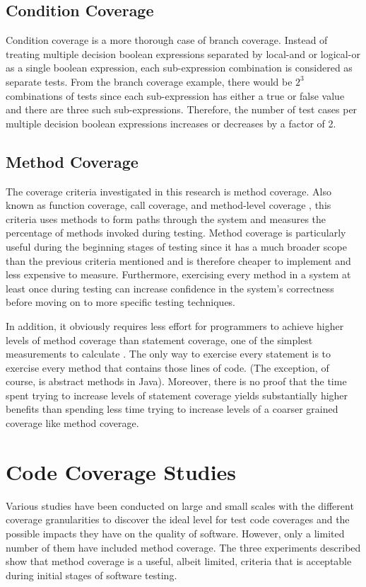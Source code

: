 \subsection{Condition Coverage}
Condition coverage is a more thorough case of branch coverage.  Instead of
treating multiple decision boolean expressions separated by local-and or
logical-or as a single boolean expression, each sub-expression combination
is considered as separate tests.  From the branch coverage example, there
would be $2^3$ combinations of tests since each sub-expression has either a
true or false value and there are three such sub-expressions.  Therefore,
the number of test cases per multiple decision boolean expressions
increases or decreases by a factor of 2.

\subsection{Method Coverage}
The coverage criteria investigated in this research is method coverage.
Also known as function coverage, call coverage, and method-level coverage
\cite{GlassJar}, this criteria uses methods to form paths through the
system and measures the percentage of methods invoked during testing.
Method coverage is particularly useful during the beginning stages of
testing since it has a much broader scope than the previous criteria
mentioned and is therefore cheaper to implement and less expensive to
measure.  Furthermore, exercising every method in a system at least once
during testing can increase confidence in the system's correctness
\cite{Dalal:1993} before moving on to more specific testing techniques.

In addition, it obviously requires less effort for programmers to achieve
higher levels of method coverage than statement coverage, one of the
simplest measurements to calculate \cite{Marick:1997} \cite{Kaner:1995}.
The only way to exercise every statement is to exercise every method that
contains those lines of code.  (The exception, of course, is abstract
methods in Java).  Moreover, there is no proof that the time spent trying
to increase levels of statement coverage yields substantially higher
benefits than spending less time trying to increase levels of a coarser
grained coverage like method coverage.

\section{Code Coverage Studies}
Various studies have been conducted on large and small scales with the
different coverage granularities to discover the ideal level for test code
coverages and the possible impacts they have on the quality of software.
However, only a limited number of them have included method coverage.  The
three experiments described show that method coverage is a useful, albeit
limited, criteria that is acceptable during initial stages of software
testing.


